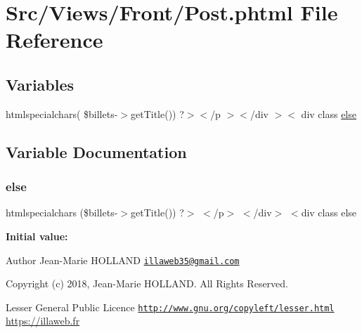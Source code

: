 \hypertarget{_post_8phtml}{}\section{Src/\+Views/\+Front/\+Post.phtml File Reference}
\label{_post_8phtml}
\subsection*{Variables}
\begin{DoxyCompactItemize}
\item 
htmlspecialchars( \$billets-\/$>$get\+Title()) ?$>$$<$/p $>$$<$/div $>$$<$ div class \hyperlink{_post_8phtml_a632f103aa4e8bdb5f1193ce0c4507c50}{else}
\end{DoxyCompactItemize}


\subsection{Variable Documentation}
\mbox{\label{_post_8phtml_a632f103aa4e8bdb5f1193ce0c4507c50}} 
\subsubsection{\texorpdfstring{else}{else}}
{\footnotesize\ttfamily htmlspecialchars (\$billets-\/$>$get\+Title()) ?$>$ $<$/p$>$ $<$/div$>$ $<$div class else}

{\bfseries Initial value\+:}
\begin{DoxyAuthor}{Author}
Jean-\/\+Marie H\+O\+L\+L\+A\+ND \href{mailto:illaweb35@gmail.com}{\tt illaweb35@gmail.\+com} 
\end{DoxyAuthor}
\begin{DoxyCopyright}{Copyright}
(c) 2018, Jean-\/\+Marie H\+O\+L\+L\+A\+ND. All Rights Reserved.
\end{DoxyCopyright}
Lesser General Public Licence \href{http://www.gnu.org/copyleft/lesser.html}{\tt http\+://www.\+gnu.\+org/copyleft/lesser.\+html} \hyperlink{}{https\+://illaweb.\+fr}